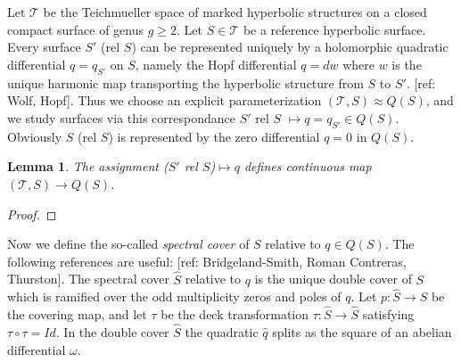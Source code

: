 \documentclass[12pt]{article}
\newtheorem{lem}[thm]{Lemma}
\theoremstyle{definition}
\theoremstyle{remark}
\newcommand{\sT}{\mathscr{T}}
\newcommand{\hS}{\hat{S}}
\begin{document}
\title{}
\author{J. H. Martel}
\date{\today}

\begin{abstract}

\end{abstract}



\section{}

Let $\sT$ be the Teichmueller space of marked hyperbolic structures on a closed compact surface of genus $g\geq 2$. Let $S\in \sT$ be a reference hyperbolic surface. Every surface $S'$ (rel $S$) can be represented uniquely by a holomorphic quadratic differential $q=q_{S'}$ on $S$, namely the Hopf differential $q=dw$ where $w$ is the unique harmonic map transporting the hyperbolic structure from $S$ to $S'$. [ref: Wolf, Hopf]. Thus we choose an explicit parameterization $(\sT, S) \approx Q(S)$, and we study surfaces via this correspondance $S'$ rel $S$ $\mapsto q=q_{S'} \in Q(S)$. Obviously $S$ (rel $S$) is represented by the zero differential $q=0$ in $Q(S)$. 

\begin{lem}
The assignment ($S'$ rel $S$)$\mapsto q$ defines continuous map $(\sT, S) \to Q(S)$. 
\end{lem}
\begin{proof}

\end{proof}

Now we define the so-called \emph{spectral cover} of $S$ relative to $q\in Q(S)$. The following references are useful: [ref: Bridgeland-Smith, Roman Contreras, Thurston]. The spectral cover $\hS$ relative to $q$ is the unique double cover of $S$ which is ramified over the odd multiplicity zeros and poles of $q$. Let $p:\hS \to S$ be the covering map, and let $\tau$ be the deck transformation $\tau: \hS \to \hS$ satisfying $\tau \circ \tau =Id$. In the double cover $\hS$ the quadratic $\hat{q}$ splits as the square of an abelian differential $\omega$.
\end{document}
